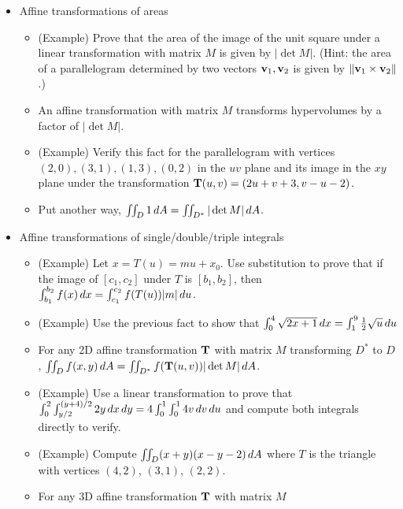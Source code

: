 \documentclass[11pt]{article}
\begin{document}
\begin{itemize}
  \item Affine transformations of areas
    \begin{itemize}
      \item (Example) Prove that the area of the image of the unit square
            under a linear transformation with matrix \(M\) is given by
            \(|\det M|\). (Hint: the area of a parallelogram determined
            by two vectors \(\mathbf{v}_1,\mathbf{v}_2\) is given by
            \(\|\mathbf{v}_1\times\mathbf{v}_2\|\).)
      \item An affine transformation with matrix \(M\) transforms hypervolumes
            by a factor of \(|\det M|\).
      \item (Example) Verify this fact for the parallelogram
            with vertices \((2,0),(3,1),(1,3),(0,2)\) in the \(uv\) plane
            and its image in the \(xy\) plane under
            the transformation \(\mathbf{T}(u,v)=(2u+v+3,v-u-2)\).
      \item Put another way, \(\iint_{D}1\,d A=\iint_{D^*}|\det M|\,d A\).
    \end{itemize}
  \item Affine transformations of single/double/triple integrals
    \begin{itemize}
      \item (Example) Let \(x=T(u)=mu+x_0\).
            Use substitution to prove that
            if the image of \([c_1,c_2]\) under \(T\) is \([b_1,b_2]\), then
            \(\int_{b_1}^{b_2}f(x)\,d x=\int_{c_1}^{c_2}f(T(u))|m|\,d u\).
      \item (Example) Use the previous fact to show that
            \(\int_0^4 \sqrt{2x+1}\,d x=\int_1^9 \frac{1}{2}\sqrt{u}\,d u\)
      \item For any 2D affine transformation \(\mathbf{T}\) with matrix \(M\)
            transforming \(D^*\) to \(D\),
            \(\iint_D f(x,y)\,d A=\iint_{D^*}f(\mathbf{T}(u,v))|\det M|\,d A\).
      \item (Example) Use a linear transformation to prove that
            \(
              \int_0^2\int_{y/2}^{(y+4)/2}2y\,d x\,d y
                =
              4\int_0^1\int_0^1 4v\,d v\,d u
            \)
            and compute both integrals directly to verify.
      \item (Example)
            Compute \(\iint_D (x+y)(x-y-2)\,d{A}\) where \(T\) is the
            triangle with vertices \((4,2)\), \((3,1)\), \((2,2)\).
      \item For any 3D affine transformation \(\mathbf{T}\) with matrix \(M\)

\end{itemize}
\end{itemize}
\end{document}
